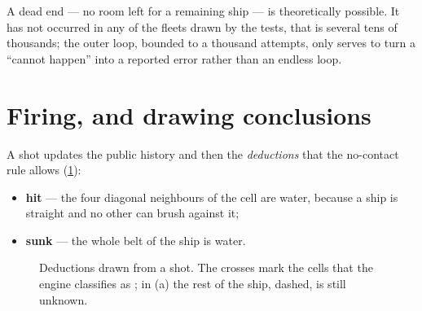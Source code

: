 A dead end --- no room left for a remaining ship --- is theoretically possible. It has not
occurred in any of the fleets drawn by the tests, that is several tens of thousands; the
outer loop, bounded to a thousand attempts, only serves to turn a \enquote{cannot happen}
into a reported error rather than an endless loop.

\section{Firing, and drawing conclusions}
\label{sec-deductions}

A shot updates the public history and then the \emph{deductions} that the no-contact rule
allows (\cref{fig-deductions}):

\begin{itemize}
    \item \textbf{hit} --- the four diagonal neighbours of the cell are water, because a
          ship is straight and no other can brush against it;
    \item \textbf{sunk} --- the whole belt of the ship is water.
\end{itemize}

\begin{figure}[ht]
    \centering
    \caption{Deductions drawn from a shot. The crosses mark the cells that the engine
        classifies as ; in (a) the rest of the ship, dashed, is still unknown.}
    \label{fig-deductions}
\end{figure}


